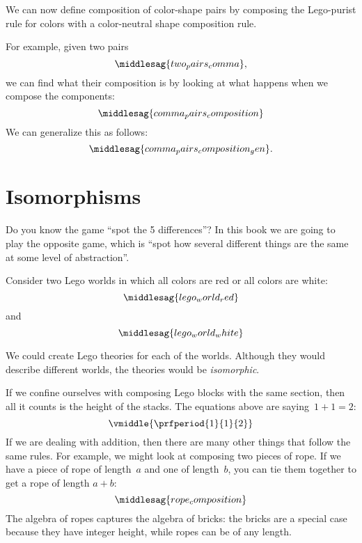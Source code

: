 We can now define composition of color-shape pairs by composing the Lego-purist rule for colors with a color-neutral shape composition rule.

For example, given two pairs
%
\begin{equation}
    \label{eq:two_pairs_comma}
    \middlesag{two_pairs_comma},
\end{equation}
%
we can find what their composition is by looking at what happens when we compose the components:
%
\begin{equation}
    \label{eq:comma_pairs_composition}
    \middlesag{comma_pairs_composition}
\end{equation}
%
We can generalize this as follows:
%
\begin{equation}
    \label{eq:comma_pairs_composition_gen}
    \middlesag{comma_pairs_composition_gen}.
\end{equation}

\section{Isomorphisms}

Do you know the game ``spot the 5 differences''?
In this book we are going to play the opposite game, which is ``spot how several different things are the same at some level of abstraction''.

Consider two Lego worlds in which all colors are red or all colors are white:
\begin{equation}
    \label{eq:lego_world_red}
    \middlesag{lego_world_red}
\end{equation}
%
and
%
\begin{equation}
    \label{eq:lego_world_white}
    \middlesag{lego_world_white}
\end{equation}

We could create Lego theories for each of the worlds.
Although they would describe different worlds, the theories would be \emph{isomorphic}.

If we confine ourselves with composing Lego blocks with the same section, then all it counts is the height of the stacks.
The equations above are saying~$1+1=2$:
%
\begin{equation}
    \vmiddle{\prfperiod{1}{1}{2}}
\end{equation}
%
If we are dealing with addition, then there are many other things that follow the same rules.
For example, we might look at composing two pieces of rope.
If we have a piece of rope of length~$a$ and one of length~$b$, you can tie them together to get a rope of length $a+b$:
%
\begin{equation}
    \label{eq:rope-compose}
    \middlesag{rope_composition}
\end{equation}
%
The algebra of ropes captures the algebra of bricks: the bricks are a special case because they have integer height, while ropes can be of any length.

